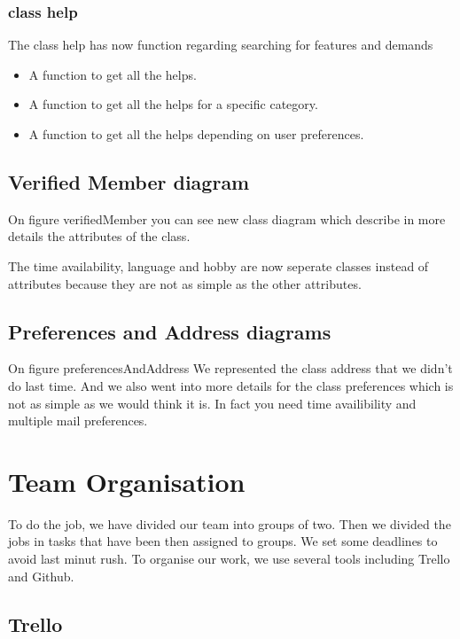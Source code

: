 \documentclass[11pt, a4paper]{article}   	%
\begin{document}
\subsubsection{class help}

The class help has now function regarding searching for features and demands
\begin{itemize}
\item A function to get all the helps.
\item A function to get all the helps for a specific category.
\item A function to get all the helps depending on user preferences.
\end{itemize}

\subsection{Verified Member diagram}


On figure {verifiedMember} you can see new class diagram which describe in more details the attributes of the class.

The time availability, language and hobby are now seperate classes instead of attributes because they are not as simple as the other
attributes. 

\subsection{Preferences and Address diagrams}


On figure {preferencesAndAddress} We represented the class address that we didn't do last time. And we also went into more details
for the class preferences which is not as simple as we would think it is. In fact you need time availibility and multiple mail preferences.



\section{Team Organisation}

To do the job, we have divided our team into groups of two.
Then we divided the jobs in tasks that have been then assigned to groups.
We set some deadlines to avoid last minut rush.
To organise our work, we use several tools including Trello and Github. 

\subsection{Trello}
\end{document}
